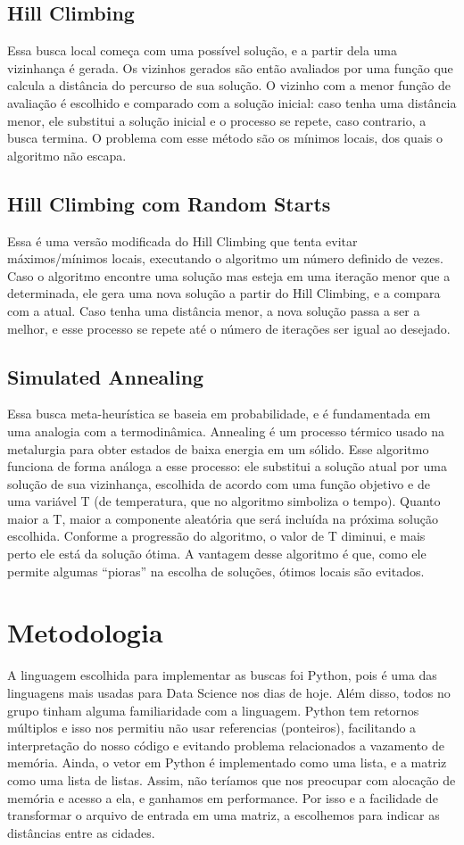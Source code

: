 \documentclass[a4paper,12 pts]{article}
\begin{document}
	\subsection{Hill Climbing}
		Essa busca local começa com uma possível solução, e a partir dela uma vizinhança é gerada. Os vizinhos gerados são então avaliados por uma função que calcula a distância do percurso de sua solução. O vizinho com a menor função de avaliação é escolhido e comparado com a solução inicial: caso tenha uma distância menor, ele substitui a solução inicial e o processo se repete, caso contrario, a busca termina. O problema com esse método são os mínimos locais, dos quais o algoritmo não escapa.

	\subsection{Hill Climbing com Random Starts}
		Essa é uma versão modificada do Hill Climbing que tenta evitar máximos/mínimos locais, executando o algoritmo um número definido de vezes. Caso o algoritmo encontre uma solução mas esteja em uma iteração menor que a determinada, ele gera uma nova solução a partir do Hill Climbing, e a compara com a atual. Caso tenha uma distância menor, a nova solução passa a ser a melhor, e esse processo se repete até o número de iterações ser igual ao desejado. 
	
	\subsection{Simulated Annealing}
		Essa busca meta-heurística se baseia em probabilidade, e é fundamentada em uma analogia com a termodinâmica. Annealing é um processo térmico usado na metalurgia para obter estados de baixa energia em um sólido. Esse algoritmo funciona de forma análoga a esse processo: ele substitui a solução atual por uma solução de sua vizinhança, escolhida de acordo com uma função objetivo e de uma variável T (de temperatura, que no algoritmo simboliza o tempo). Quanto maior a T, maior a componente aleatória que será incluída na próxima solução escolhida. Conforme a progressão do algoritmo, o valor de T diminui, e mais perto ele está da solução ótima. A vantagem desse algoritmo é que, como ele permite algumas “pioras” na escolha de soluções, ótimos locais são evitados.

\section{Metodologia}
	A linguagem escolhida para implementar as buscas foi Python, pois é uma das linguagens mais usadas para Data Science nos dias de hoje. Além disso, todos no grupo tinham alguma familiaridade com a linguagem. Python tem retornos múltiplos e isso nos permitiu não usar referencias (ponteiros), facilitando a interpretação do nosso código e evitando problema relacionados a vazamento de memória. Ainda, o vetor em Python é implementado como uma lista, e a matriz como uma lista de listas. Assim, não teríamos que nos preocupar com alocação de memória e acesso a ela, e ganhamos em performance. Por isso e a facilidade de transformar o arquivo de entrada em uma matriz, a escolhemos para indicar as distâncias entre as cidades.
\newpage
\end{document}
